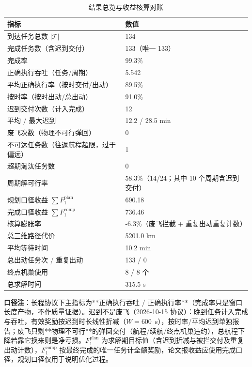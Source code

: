 \documentclass[a4paper,11pt]{article}
\begin{document}
\begin{table}[htbp]\centering
\caption{结果总览与收益核算对账}
\label{tab:exp01-outcome}
\begin{tabular}{ll}
\toprule
指标 & 数值 \\
\midrule
到达任务总数 $|\mathcal{T}|$ & 134 \\
完成任务数（含迟到交付） & 133（唯一 133） \\
完成率 & 99.3\% \\
正确执行吞吐（任务/周期） & 5.542 \\
平均正确执行率（按时交付/出动） & 89.5\% \\
按时率（按时出动/总出动） & 91.0\% \\
迟到交付次数（计入完成） & 12 \\
平均 / 最大迟到 & 12.2 / 28.5 min \\
废飞次数（物理不可行弹回） & 0 \\
不可达任务数（往返航程超限，过于偏远） & 1 \\
超期淘汰任务数 & 0 \\
周期解可行率 & 58.3\%（14/24；其中 10 个周期含迟到交付） \\
规划口径收益 $\sum F_1^{\mathrm{plan}}$ & 690.18 \\
完成口径收益 $\sum F_1^{\mathrm{comp}}$ & 736.46 \\
核算膨胀率 & -6.3\%（废飞拦截 + 重复出动重复计数） \\
总三维路径代价 & 5201.0 km \\
平均等待时间 & 10.2 min \\
总出动任务次 / 重复出动 & 133 / 0 \\
终点机巢使用 & 8 / 8 个 \\
总求解时间 & 315.5 s \\
\bottomrule
\end{tabular}

\vspace{2pt}\parbox{0.92\linewidth}{\footnotesize \textbf{口径注}：长程协议下主指标为**正确执行吞吐 / 正确执行率**（完成率只是窗口长度产物，不作质量证据）。迟到不是废飞（2026-10-15 协议）：晚到任务计入完成与吞吐，有效奖励按迟到时长线性折减（$W=600$~s），按时率/平均迟到单独报告；废飞只剩**物理不可行**的弹回交付（航程/续航/终点机巢违约），总航程下降若靠它换来则是净亏损。$F_1^{\mathrm{plan}}$ 为求解期目标值（含迟到折减与被拦交付及重复出动计数），$F_1^{\mathrm{comp}}$ 按最终完成的唯一任务计全额奖励，论文报收益应使用完成口径，规划口径仅用于说明优化过程。}
\end{table}
\end{document}
